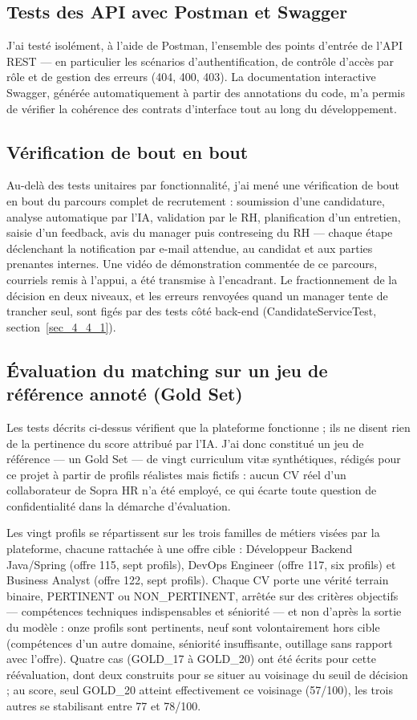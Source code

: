 \subsection{Tests des API avec Postman et Swagger}
\label{sec_4_4_3}
J’ai testé isolément, à l’aide de Postman, l’ensemble des points d’entrée de l’API REST — en particulier les scénarios d’authentification, de contrôle d’accès par rôle et de gestion des erreurs (404, 400, 403). La documentation interactive Swagger, générée automatiquement à partir des annotations du code, m’a permis de vérifier la cohérence des contrats d’interface tout au long du développement.

\subsection{Vérification de bout en bout}
\label{sec_4_4_4}
Au-delà des tests unitaires par fonctionnalité, j’ai mené une vérification de bout en bout du parcours complet de recrutement : soumission d’une candidature, analyse automatique par l’IA, validation par le RH, planification d’un entretien, saisie d’un feedback, avis du manager puis contreseing du RH — chaque étape déclenchant la notification par e-mail attendue, au candidat et aux parties prenantes internes. Une vidéo de démonstration commentée de ce parcours, courriels remis à l’appui, a été transmise à l’encadrant. Le fractionnement de la décision en deux niveaux, et les erreurs renvoyées quand un manager tente de trancher seul, sont figés par des tests côté back-end (Candidate\-Service\-Test, section~\ref{sec_4_4_1}).

\subsection{Évaluation du matching sur un jeu de référence annoté (Gold Set)}
\label{sec_4_4_5}
Les tests décrits ci-dessus vérifient que la plateforme fonctionne ; ils ne disent rien de la pertinence du score attribué par l’IA. J’ai donc constitué un jeu de référence — un Gold Set \cite{ref21} — de vingt curriculum vitæ synthétiques, rédigés pour ce projet à partir de profils réalistes mais fictifs : aucun CV réel d’un collaborateur de Sopra HR n’a été employé, ce qui écarte toute question de confidentialité dans la démarche d’évaluation.

Les vingt profils se répartissent sur les trois familles de métiers visées par la plateforme, chacune rattachée à une offre cible : Développeur Backend Java/Spring (offre 115, sept profils), DevOps Engineer (offre 117, six profils) et Business Analyst (offre 122, sept profils). Chaque CV porte une vérité terrain binaire, PERTINENT ou NON\_PERTINENT, arrêtée sur des critères objectifs — compétences techniques indispensables et séniorité — et non d’après la sortie du modèle : onze profils sont pertinents, neuf sont volontairement hors cible (compétences d’un autre domaine, séniorité insuffisante, outillage sans rapport avec l’offre). Quatre cas (GOLD\_17 à GOLD\_20) ont été écrits pour cette réévaluation, dont deux construits pour se situer au voisinage du seuil de décision ; au score, seul GOLD\_20 atteint effectivement ce voisinage (57/100), les trois autres se stabilisant entre 77 et 78/100.

